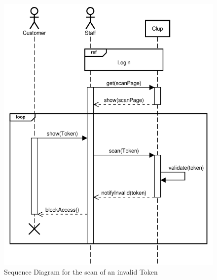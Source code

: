\begin{figure}[H]
    \centering
    \includegraphics[scale=0.9]{Images/Sequence/failedscan-token_sequence_straight.pdf}
    \caption{Sequence Diagram for the scan of an invalid Token}
\end{figure}
